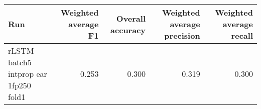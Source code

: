 \begin{tabular}{lrrrr}
\toprule
Run & Weighted average F1 & Overall accuracy & Weighted average precision & Weighted average recall \\
\midrule
rLSTM batch5 intprop ear 1fp250 fold1 & 0.253 & 0.300 & 0.319 & 0.300 \\
\bottomrule
\end{tabular}
